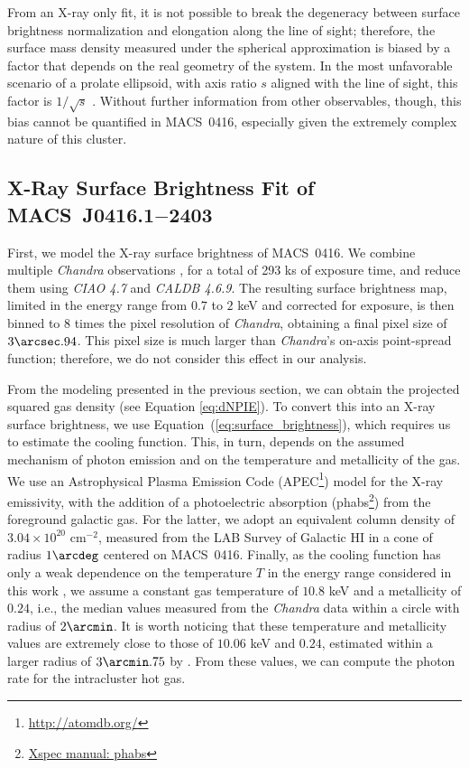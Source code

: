 \documentclass[twocolumn]{aastex61}
\begin{document}
From an X-ray only fit, it is not possible to break the degeneracy 
between surface brightness normalization and elongation along the line of
sight; therefore, the surface mass density measured under the spherical approximation
is biased by a factor that depends on the real geometry of the system.
In the most unfavorable scenario of a prolate
ellipsoid, with axis ratio $s$ aligned with the line of sight, this factor is $1/\sqrt{s}$ \citep{DeFilippis2005}.
Without further information from other observables, though, this bias cannot be
quantified in MACS~0416, especially given the extremely
complex nature of this cluster.

\subsection{X-Ray Surface Brightness Fit of MACS~J0416.1$-$2403}
First, we model the X-ray surface brightness of MACS~0416.
We combine multiple \emph{Chandra} observations \citep[obsID: 16236, 16237, 16304, 16523,
17313; see][]{Ogrean2015}, for a total of 293 ks of exposure time, and reduce
them using \emph{CIAO 4.7} and \emph{CALDB 4.6.9}.
The resulting surface brightness map, limited in the energy range from $0.7$ to
$2$ keV and corrected for exposure, is then binned to 8 times the pixel
resolution of \emph{Chandra}, obtaining a final pixel size of $3\arcsec.94$.
This pixel size is much larger than \emph{Chandra}'s on-axis point-spread function;
therefore, we do not consider this effect in our analysis.

From the modeling presented in the previous section, we can obtain the projected squared
gas density (see Equation \ref{eq:dNPIE}).
To convert this into an X-ray surface brightness, we use Equation~(\ref{eq:surface_brightness}),
which requires us to estimate the cooling function.
This, in turn, depends on the assumed mechanism of photon emission and on the
temperature and metallicity of the gas.
We use an Astrophysical Plasma Emission Code (APEC\footnote{\url{http://atomdb.org/}})
model for the X-ray emissivity, with the addition of a photoelectric absorption
(phabs\footnote{\href{http://heasarc.gsfc.nasa.gov/docs/xanadu/xspec/manual/XSmodelPhabs.html}{Xspec manual: phabs}})
from the foreground galactic gas.
For the latter, we adopt an equivalent column density of $3.04 \times 10^{20}$ cm$^{-2}$,
measured from the LAB Survey of Galactic HI \citep{Kalberla2005} in a cone of
radius $1\arcdeg$ centered on MACS~0416.
Finally, as the cooling function has only a weak dependence on the temperature
$T$ in the energy range considered in this work \citep{Ettori2000}, we assume a
constant gas temperature of $10.8$ keV and a metallicity of $0.24$, i.e., the
median values measured from the \emph{Chandra} data within a circle with radius
of $2 \arcmin$.
It is worth noticing that these temperature and metallicity values are extremely
close to those of $10.06$ keV and $0.24$, estimated within a larger
radius of $3\arcmin.75$ by \citet{Ogrean2015}.
From these values, we can compute the photon rate for the intracluster hot gas.
\end{document}
